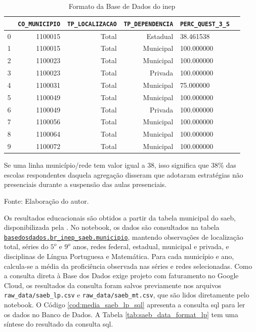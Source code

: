 \documentclass[
	12pt,				%
	openright,			%
	oneside,			%
	a4paper,			%
	brazil,				%
	]{article}
\begin{document}
\begin{table}[htbp]
\caption{Formato da Base de Dados do \acrshort{inep}}\label{tab:inep_data_format}
\centering
\begin{tabular}{rrrrl r}
\toprule
 & \texttt{CO\_MUNICIPIO} & \texttt{TP\_LOCALIZACAO} & \texttt{TP\_DEPENDENCIA} & \texttt{PERC\_QUEST\_3\_S} \\
\midrule
0 & 1100015 & Total & Estadual  & 38.461538 \\
1 & 1100015 & Total & Municipal & 100.000000 \\
2 & 1100023 & Total & Municipal & 100.000000 \\
3 & 1100023 & Total & Privada   & 100.000000 \\
4 & 1100031 & Total & Municipal & 75.000000 \\
5 & 1100049 & Total & Municipal & 100.000000 \\
6 & 1100049 & Total & Privada   & 100.000000 \\
7 & 1100056 & Total & Municipal & 100.000000 \\
8 & 1100064 & Total & Municipal & 100.000000 \\
9 & 1100072 & Total & Municipal & 100.000000 \\
\bottomrule
\end{tabular}
\begin{tablenotes}
\footnotesize
\item Se uma linha município/rede tem valor igual a 38, isso significa que 38\% das escolas respondentes daquela agregação disseram que adotaram estratégias não presenciais durante a suspensão das aulas presenciais.
\item Fonte: Elaboração do autor.
\end{tablenotes}
\end{table}

Os resultados educacionais são obtidos a partir da tabela municipal do
\acrshort{saeb}, disponibilizada pela \textcite{Base_dos_Dados}. No notebook, os
dados são consultados na tabela \texttt{\href{https://basedosdados.org/dataset/e083c9a2-1cee-4342-bedc-535cbad6f3cd?table=213953ad-a609-46a3-b3e0-a0a843cba843}{basedosdados.br\_inep\_saeb.municipio}},
mantendo observações de localização total, séries do $5^{o}$ e $9^{o}$ anos, redes
federal, estadual, municipal e privada, e disciplinas de Língua Portuguesa e
Matemática. Para cada município e ano, calcula-se a média da proficiência
observada nas séries e redes selecionadas. Como a consulta direta à Base dos
Dados exige projeto com faturamento no Google Cloud, os resultados da consulta
foram salvos previamente nos arquivos \texttt{raw\_data/saeb\_lp.csv} e
\texttt{raw\_data/saeb\_mt.csv}, que são lidos diretamente pelo notebook. 
O Código \ref{cod:media_saeb_lp_sql} apresenta a consulta \acrshort{sql} para ler os dados no
Banco de Dados. A Tabela \ref{tab:saeb_data_format_lp} tem uma síntese do resultado
da consulta \acrshort{sql}.
\end{document}

